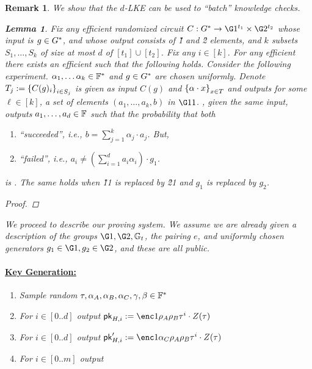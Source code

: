 \documentclass[11pt]{article}
\numberwithin{figure}{section} %
\newtheorem{lemma}[thm]{Lemma}
\newtheorem{remark}[thm]{Remark}
\begin{document}
\begin{remark}
We show that the $d$-LKE can be used to ``batch'' knowledge checks.

\begin{lemma}\label{lem:batchLKE}
Fix any efficient randomized circuit $C:\grouppair \to \G1^{t_1}\times \G2^{t_2}$ whose input is $g\in G^*$, and whose output consists of \G1 and \G2 elements, and $k$ subsets $S_1,\ldots,S_k$ of size at most $d$ of $[t_1]\cup [t_2]$.
Fix any $i\in [k]$.
For any efficient \adv there exists an efficient \ext such that the following holds.
Consider the following experiment.
 $\alpha_1,\ldots\alpha_k\in \mathbb F^*$ and $g\in G^*$ are chosen uniformly.
 Denote $T_j:= \left\{C(g)_i\right\}_{i\in S_j}$
 \adv is given as input $C(g)$ and $\left\{\alpha\cdot x \right\}_{x\in T}$
 and outputs for some $\ell \in [k]$, a set of elements  $(a_1,\ldots, a_k,b)$ in $\G11$.
   \ext, given the same input, outputs  
 $a_1,\ldots,a_d \in \mathbb F$ such that the probability that both
   
 \begin{enumerate}
  \item \adv ``succeeded'', i.e., $b=\sum_{j=1}^k\alpha_j\cdot a_j$. But,
  \item \ext ``failed'', i.e., $a_i \neq (\sum_{i=1}^d a_i \alpha_i)\cdot g_1$.
   \end{enumerate}
is \neg.
 The same holds when \G11 is replaced by \G21 and $g_1$ is replaced by $g_2$.
\end{lemma}
\begin{proof}
 
\end{proof}



We proceed to describe our proving system.
We assume we are already given a description of the groups $\G1,\G2,\Gt$, the pairing $e$, and uniformly chosen generators 
$g_1\in \G1,g_2\in \G2$, and these are all public.
\paragraph{\underline{Key Generation:}}

\begin{enumerate}
 \item Sample random $\tau,\alpha_A,\alpha_B,\alpha_C,\gamma,\beta\in \mathbb F^*$
 \item For $i\in [0..d]$ output $\pk_{H,i}\defeq \enc1{\rho_A\rho_B \tau^i\cdot Z(\tau)}$
\item For $i\in [0..d]$ output $\pk'_{H,i}\defeq \enc1{\alpha_C \rho_A\rho_B \tau^i\cdot Z(\tau)}$
 \item For $i\in [0..m]$ output
 

\end{enumerate}
\end{remark}
\end{document}
